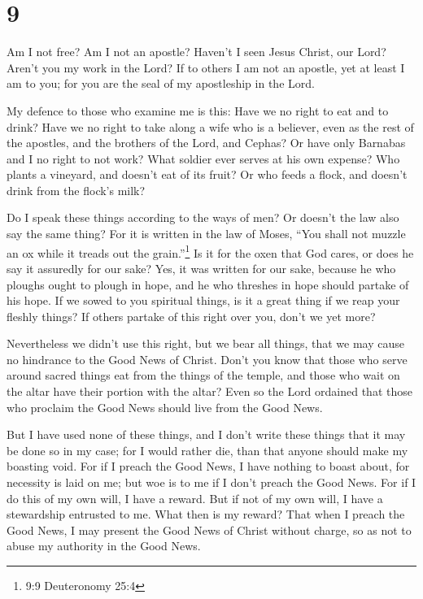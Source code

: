 \hypertarget{section-8}{%
\section{9}\label{section-8}}

 Am I not free? Am I not an apostle? Haven't I seen Jesus
Christ, our Lord? Aren't you my work in the Lord?  If to
others I am not an apostle, yet at least I am to you; for you are the
seal of my apostleship in the Lord.

 My defence to those who examine me is this: 
Have we no right to eat and to drink?  Have we no right to
take along a wife who is a believer, even as the rest of the apostles,
and the brothers of the Lord, and Cephas?  Or have only
Barnabas and I no right to not work?  What soldier ever
serves at his own expense? Who plants a vineyard, and doesn't eat of its
fruit? Or who feeds a flock, and doesn't drink from the flock's milk?

 Do I speak these things according to the ways of men? Or
doesn't the law also say the same thing?  For it is written
in the law of Moses, ``You shall not muzzle an ox while it treads out
the grain.''\footnote{9:9 Deuteronomy 25:4} Is it for the oxen that God
cares,  or does he say it assuredly for our sake? Yes, it
was written for our sake, because he who ploughs ought to plough in
hope, and he who threshes in hope should partake of his hope.
 If we sowed to you spiritual things, is it a great thing
if we reap your fleshly things?  If others partake of this
right over you, don't we yet more?

Nevertheless we didn't use this right, but we bear all things, that we
may cause no hindrance to the Good News of Christ.  Don't
you know that those who serve around sacred things eat from the things
of the temple, and those who wait on the altar have their portion with
the altar?  Even so the Lord ordained that those who
proclaim the Good News should live from the Good News.

 But I have used none of these things, and I don't write
these things that it may be done so in my case; for I would rather die,
than that anyone should make my boasting void.  For if I
preach the Good News, I have nothing to boast about, for necessity is
laid on me; but woe is to me if I don't preach the Good News.
 For if I do this of my own will, I have a reward. But if
not of my own will, I have a stewardship entrusted to me. 
What then is my reward? That when I preach the Good News, I may present
the Good News of Christ without charge, so as not to abuse my authority
in the Good News.


